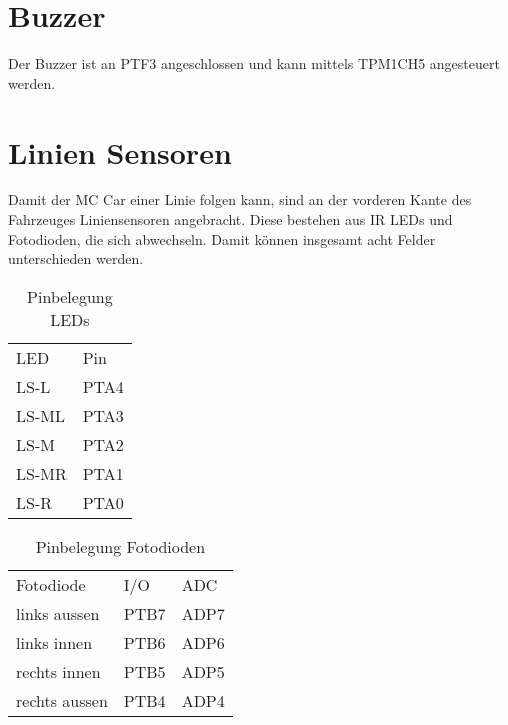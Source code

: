 \documentclass[a4paper,10pt,fleqn]{article}
\begin{document}
\section{Buzzer}
Der Buzzer ist an PTF3 angeschlossen und kann mittels TPM1CH5 angesteuert 
werden. 

\section{Linien Sensoren}
Damit der MC Car einer Linie folgen kann, sind an der vorderen Kante des 
Fahrzeuges Liniensensoren angebracht. Diese bestehen aus IR LEDs und 
Fotodioden, die sich abwechseln. Damit können insgesamt acht Felder 
unterschieden werden. 
\begin{table}[h!]
\begin{tabular}{ll}
\rowcolor{white} LED    & Pin   \\
\rowcolor{lgray} LS-L   & PTA4  \\
\rowcolor{white} LS-ML  & PTA3  \\
\rowcolor{lgray} LS-M   & PTA2  \\
\rowcolor{white} LS-MR  & PTA1  \\
\rowcolor{lgray} LS-R   & PTA0  \\
\end{tabular}
\caption{Pinbelegung LEDs}
\end{table}
\begin{table}[h!]
\begin{tabular}{lll}
\rowcolor{white} Fotodiode      & I/O   & ADC   \\
\rowcolor{lgray} links aussen   & PTB7  & ADP7  \\
\rowcolor{white} links innen    & PTB6  & ADP6  \\
\rowcolor{lgray} rechts innen   & PTB5  & ADP5  \\
\rowcolor{white} rechts aussen  & PTB4  & ADP4  \\
\end{tabular}
\caption{Pinbelegung Fotodioden}
\end{table}
\end{document}
